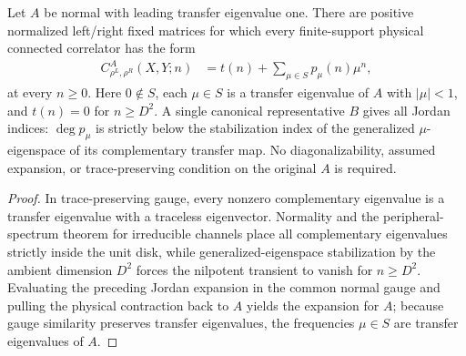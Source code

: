\begin{lemma}
    \label{thm:correlator_sum_exponentials}
    \leanok
    Let $A$ be normal with leading transfer eigenvalue one. There are positive
    normalized left/right fixed matrices for which every finite-support
    physical connected correlator has the form
    \begin{align}
        C_{\rho^L,\rho^R}^{A}(X,Y;n)
         & =t(n)+\sum_{\mu\in S}p_\mu(n)\mu^n,
        \label{eq:correlations_spectral_expansion}
    \end{align}
    at every $n\ge0$. Here $0\notin S$, each $\mu\in S$ is a transfer
    eigenvalue of $A$ with $|\mu|<1$, and $t(n)=0$ for $n\ge D^2$.
    A single canonical representative $B$ gives all Jordan indices:
    $\deg p_\mu$ is strictly below the stabilization index of the generalized
    $\mu$-eigenspace of its complementary transfer map. No diagonalizability,
    assumed expansion, or trace-preserving condition on the original $A$
    is required.
\end{lemma}
\begin{proof}
    \leanok
    In trace-preserving gauge, every nonzero complementary eigenvalue is a
    transfer eigenvalue with a traceless eigenvector. Normality and the
    peripheral-spectrum theorem for irreducible channels place all complementary
    eigenvalues strictly inside the unit disk, while generalized-eigenspace
    stabilization by the ambient dimension $D^2$ forces the nilpotent transient
    to vanish for $n\ge D^2$. Evaluating the preceding Jordan expansion in the
    common normal gauge and pulling the physical contraction back to $A$ yields
    the expansion for $A$; because gauge similarity preserves transfer
    eigenvalues, the frequencies $\mu\in S$ are transfer eigenvalues of $A$.
\end{proof}

